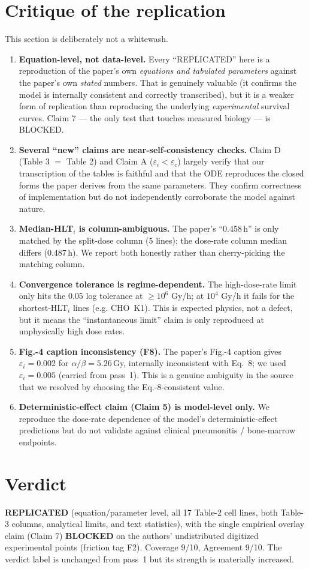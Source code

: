 \documentclass[11pt]{article}
\begin{document}
\section{Critique of the replication}
This section is deliberately not a whitewash.
\begin{enumerate}
\item \textbf{Equation-level, not data-level.} Every ``REPLICATED'' here is a
reproduction of the paper's own \emph{equations and tabulated parameters} against
the paper's own \emph{stated} numbers. That is genuinely valuable (it confirms the
model is internally consistent and correctly transcribed), but it is a weaker form
of replication than reproducing the underlying \emph{experimental} survival curves.
Claim 7 --- the only test that touches measured biology --- is BLOCKED.
\item \textbf{Several ``new'' claims are near-self-consistency checks.} Claim D
(Table 3 $=$ Table 2) and Claim A ($\varepsilon_i<\varepsilon_c$) largely verify
that our transcription of the tables is faithful and that the ODE reproduces the
closed forms the paper derives from the same parameters. They confirm correctness
of implementation but do not independently corroborate the model against nature.
\item \textbf{Median-HLT$_i$ is column-ambiguous.} The paper's ``0.458\,h'' is only
matched by the split-dose column (5 lines); the dose-rate column median differs
(0.487\,h). We report both honestly rather than cherry-picking the matching column.
\item \textbf{Convergence tolerance is regime-dependent.} The high-dose-rate limit
only hits the 0.05 log tolerance at $\ge10^6$ Gy/h; at $10^4$ Gy/h it fails for the
shortest-HLT$_i$ lines (e.g. CHO~K1). This is expected physics, not a defect, but it
means the ``instantaneous limit'' claim is only reproduced at unphysically high dose
rates.
\item \textbf{Fig.-4 caption inconsistency (F8).} The paper's Fig.-4 caption gives
$\varepsilon_i = 0.002$ for $\alpha/\beta = 5.26$\,Gy, internally inconsistent with
Eq.~8; we used $\varepsilon_i = 0.005$ (carried from pass~1). This is a genuine
ambiguity in the source that we resolved by choosing the Eq.-8-consistent value.
\item \textbf{Deterministic-effect claim (Claim 5) is model-level only.} We
reproduce the dose-rate dependence of the model's deterministic-effect predictions
but do not validate against clinical pneumonitis / bone-marrow endpoints.
\end{enumerate}

\section{Verdict}
\textbf{REPLICATED} (equation/parameter level, all 17 Table-2 cell lines, both
Table-3 columns, analytical limits, and text statistics), with the single empirical
overlay claim (Claim 7) \textbf{BLOCKED} on the authors' undistributed digitized
experimental points (friction tag F2). Coverage 9/10, Agreement 9/10. The verdict
label is unchanged from pass~1 but its strength is materially increased.


\end{document}
